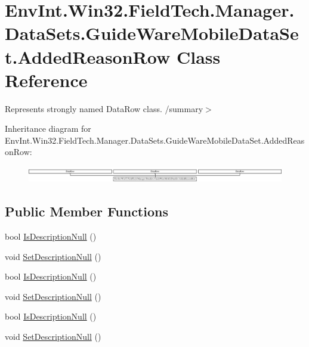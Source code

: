 \hypertarget{class_env_int_1_1_win32_1_1_field_tech_1_1_manager_1_1_data_sets_1_1_guide_ware_mobile_data_set_1_1_added_reason_row}{}\section{Env\+Int.\+Win32.\+Field\+Tech.\+Manager.\+Data\+Sets.\+Guide\+Ware\+Mobile\+Data\+Set.\+Added\+Reason\+Row Class Reference}
\label{class_env_int_1_1_win32_1_1_field_tech_1_1_manager_1_1_data_sets_1_1_guide_ware_mobile_data_set_1_1_added_reason_row}


Represents strongly named Data\+Row class. /summary$>$  


Inheritance diagram for Env\+Int.\+Win32.\+Field\+Tech.\+Manager.\+Data\+Sets.\+Guide\+Ware\+Mobile\+Data\+Set.\+Added\+Reason\+Row\+:\begin{figure}[H]
\begin{center}
\leavevmode
\includegraphics[height=0.719332cm]{class_env_int_1_1_win32_1_1_field_tech_1_1_manager_1_1_data_sets_1_1_guide_ware_mobile_data_set_1_1_added_reason_row}
\end{center}
\end{figure}
\subsection*{Public Member Functions}
\begin{DoxyCompactItemize}
\item 
bool \hyperlink{class_env_int_1_1_win32_1_1_field_tech_1_1_manager_1_1_data_sets_1_1_guide_ware_mobile_data_set_1_1_added_reason_row_a602a497dba05965e94bac14f372b5bb5}{Is\+Description\+Null} ()
\item 
void \hyperlink{class_env_int_1_1_win32_1_1_field_tech_1_1_manager_1_1_data_sets_1_1_guide_ware_mobile_data_set_1_1_added_reason_row_a34bc167a954046de1736e0b8706392aa}{Set\+Description\+Null} ()
\item 
bool \hyperlink{class_env_int_1_1_win32_1_1_field_tech_1_1_manager_1_1_data_sets_1_1_guide_ware_mobile_data_set_1_1_added_reason_row_a602a497dba05965e94bac14f372b5bb5}{Is\+Description\+Null} ()
\item 
void \hyperlink{class_env_int_1_1_win32_1_1_field_tech_1_1_manager_1_1_data_sets_1_1_guide_ware_mobile_data_set_1_1_added_reason_row_a34bc167a954046de1736e0b8706392aa}{Set\+Description\+Null} ()
\item 
bool \hyperlink{class_env_int_1_1_win32_1_1_field_tech_1_1_manager_1_1_data_sets_1_1_guide_ware_mobile_data_set_1_1_added_reason_row_a602a497dba05965e94bac14f372b5bb5}{Is\+Description\+Null} ()
\item 
void \hyperlink{class_env_int_1_1_win32_1_1_field_tech_1_1_manager_1_1_data_sets_1_1_guide_ware_mobile_data_set_1_1_added_reason_row_a34bc167a954046de1736e0b8706392aa}{Set\+Description\+Null} ()
\end{DoxyCompactItemize}
